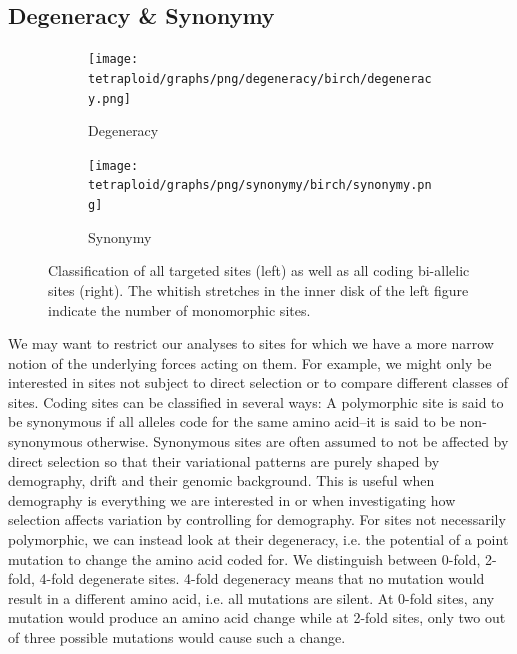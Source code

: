 \documentclass[hidelinks,11pt]{article}
\begin{document}
{    \subsection{Degeneracy \& Synonymy}
    \label{sec:degeneracy-synonymy}

    \begin{figure}[ht]
        \centering
        \begin{subfigure}[b]{0.46\textwidth}
            \centering
            \texttt{[image: tetraploid/graphs/png/degeneracy/birch/degeneracy.png]}
            \caption{Degeneracy}
            \label{fig:degeneracy}
        \end{subfigure}
        \hfill
        \begin{subfigure}[b]{0.52\textwidth}
            \centering
            \texttt{[image: tetraploid/graphs/png/synonymy/birch/synonymy.png]}
            \caption{Synonymy}
            \label{fig:synonymy}
        \end{subfigure}
        \caption{Classification of all targeted sites (left) as well as all coding bi-allelic sites (right). The whitish stretches in the inner disk of the left figure indicate the number of monomorphic sites.}
        \label{fig:synonymy_degeneracy}
    \end{figure}

    We may want to restrict our analyses to sites for which we have a more narrow notion of the underlying forces acting on them. For example, we might only be interested in sites not subject to direct selection or to compare different classes of sites. Coding sites can be classified in several ways: A polymorphic site is said to be synonymous if all alleles code for the same amino acid--it is said to be non-synonymous otherwise. Synonymous sites are often assumed to not be affected by direct selection so that their variational patterns are purely shaped by demography, drift and their genomic background. This is useful when demography is everything we are interested in or when investigating how selection affects variation by controlling for demography. For sites not necessarily polymorphic, we can instead look at their degeneracy, i.e. the potential of a point mutation to change the amino acid coded for. We distinguish between 0-fold, 2-fold, 4-fold degenerate sites. 4-fold degeneracy means that no mutation would result in a different amino acid, i.e. all mutations are silent. At 0-fold sites, any mutation would produce an amino acid change while at 2-fold sites, only two out of three possible mutations would cause such a change.

}
\end{document}
